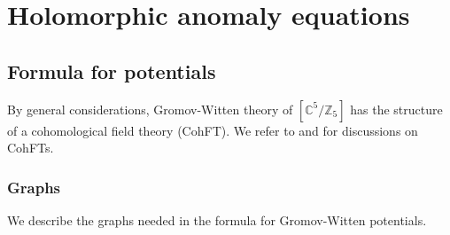 \documentclass[12pt]{amsart}
\numberwithin{equation}{section}
\begin{document}

\section{Holomorphic anomaly equations}\label{sec:HAE}
\subsection{Formula for potentials}\label{subsec:CohFT_formula}
By general considerations, Gromov-Witten theory of $[\mathbb{C}^5/\mathbb{Z}_5]$ has the structure of a cohomological field theory (CohFT). We refer to \cite{km} and \cite{Picm} for discussions on CohFTs. 

\subsubsection{Graphs}
We describe the graphs needed in the formula for Gromov-Witten potentials.
\end{document}

